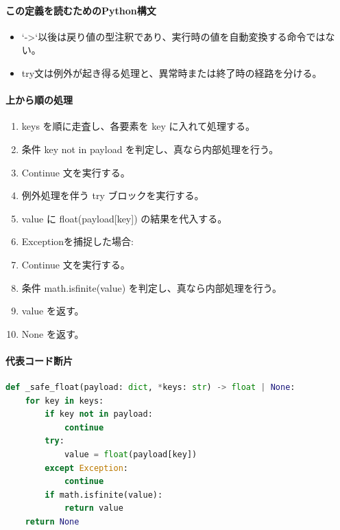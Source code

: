 \documentclass[a4paper,11pt]{article}
\begin{document}
            \paragraph{この定義を読むためのPython構文}
            \begin{itemize}[leftmargin=1.6em]
            \item `->`以後は戻り値の型注釈であり、実行時の値を自動変換する命令ではない。
\item try文は例外が起き得る処理と、異常時または終了時の経路を分ける。
            \end{itemize}
            \paragraph{上から順の処理}
            \begin{enumerate}[leftmargin=1.8em]
            \item keys を順に走査し、各要素を key に入れて処理する。
\item   条件 key not in payload を判定し、真なら内部処理を行う。
\item     Continue 文を実行する。
\item   例外処理を伴う try ブロックを実行する。
\item     value に float(payload[key]) の結果を代入する。
\item     Exceptionを捕捉した場合:
\item     Continue 文を実行する。
\item   条件 math.isfinite(value) を判定し、真なら内部処理を行う。
\item     value を返す。
\item None を返す。
            \end{enumerate}
            \paragraph{代表コード断片}
            \begin{lstlisting}[language=Python]
def _safe_float(payload: dict, *keys: str) -> float | None:
    for key in keys:
        if key not in payload:
            continue
        try:
            value = float(payload[key])
        except Exception:
            continue
        if math.isfinite(value):
            return value
    return None
\end{lstlisting}
\end{document}
